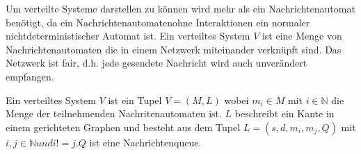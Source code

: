 Um verteilte Systeme darstellen zu können wird mehr als ein Nachrichtenautomat
benötigt, da ein Nachrichtenautomatenohne Interaktionen ein normaler
nichtdeterministischer Automat ist. Ein verteiltes System $V$ ist eine Menge von
Nachrichtenautomaten die in einem Netzwerk miteinander verknüpft sind.
Das Netzwerk ist fair, d.h. jede gesendete Nachricht wird auch unverändert
empfangen.~\cite{bickford2003logic}

\begin{defi}
  Ein verteiltes System $V$ ist ein Tupel $V=(M,L)$ wobei $m_i\in M$ mit $i\in
  \mathbb{N}$ die Menge der teilnehmenden Nachritenautomaten ist. $L$ beschreibt
  ein Kante in einem gerichteten Graphen und besteht aus dem Tupel $L=(s,d,m_i,m_j,Q)$ 
  mit $i,j\in \mathbb{N} und i!= j.Q$ ist eine Nachrichtenqueue.
\end{defi}


